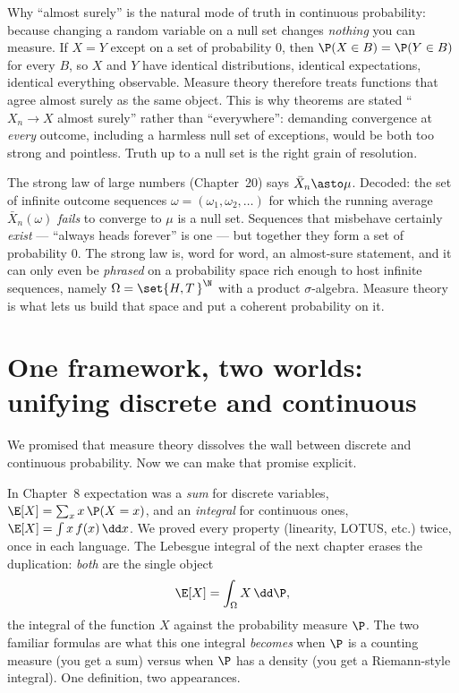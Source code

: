 \begin{focusbox}
Why ``almost surely'' is the natural mode of truth in continuous probability:
because changing a random variable on a null set changes \emph{nothing} you can
measure. If $X = Y$ except on a set of probability $0$, then
$\P(X \in B) = \P(Y \in B)$ for every $B$, so $X$ and $Y$ have identical
distributions, identical expectations, identical everything observable. Measure
theory therefore treats functions that agree almost surely as the same object.
This is why theorems are stated ``$X_n \to X$ almost surely'' rather than
``everywhere'': demanding convergence at \emph{every} outcome, including a
harmless null set of exceptions, would be both too strong and pointless. Truth up
to a null set is the right grain of resolution.
\end{focusbox}

\begin{example}
\label{ch36:sln-reread}
The strong law of large numbers (Chapter~20) says
$\bar{X}_n \asto \mu$. Decoded: the set of infinite outcome sequences
$\omega = (\omega_1, \omega_2, \dots)$ for which the running average
$\bar{X}_n(\omega)$ \emph{fails} to converge to $\mu$ is a null set. Sequences
that misbehave certainly \emph{exist} --- ``always heads forever'' is one --- but
together they form a set of probability $0$. The strong law is, word for word, an
almost-sure statement, and it can only even be \emph{phrased} on a probability
space rich enough to host infinite sequences, namely
$\Omega = \set{H,T\,}^{\N}$ with a product $\sigma$-algebra. Measure theory is
what lets us build that space and put a coherent probability on it.
\end{example}

\section{One framework, two worlds: unifying discrete and continuous}
\label{ch36:unify}

We promised that measure theory dissolves the wall between discrete and continuous
probability. Now we can make that promise explicit.

In Chapter~8 expectation was a \emph{sum} for discrete variables,
$\E[X] = \sum_x x\,\P(X=x)$, and an \emph{integral} for continuous ones,
$\E[X] = \int x\,f(x)\,\dd x$. We proved every property (linearity, LOTUS, etc.)
twice, once in each language. The Lebesgue integral of the next chapter erases the
duplication: \emph{both} are the single object
\[
  \E[X] = \int_{\Omega} X \,\dd\P,
\]
the integral of the function $X$ against the probability measure $\P$. The two
familiar formulas are what this one integral \emph{becomes} when $\P$ is a counting
measure (you get a sum) versus when $\P$ has a density (you get a Riemann-style
integral). One definition, two appearances.

